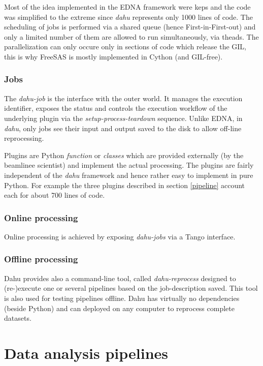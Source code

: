 \documentclass[preprint]{iucr}              %
\begin{document}
Most of the idea implemented in the EDNA framework were keps and the code was simplified to the extreme since \textit{dahu} represents only 1000 lines of code. 
The scheduling of jobs is performed via a shared queue (hence First-in-First-out) and only a limited number of them are allowed to run simultaneously, via theads.
The parallelization can only occure only in sections of code which release the GIL, this is why FreeSAS is mostly implemented in Cython (and GIL-free).      

\subsubsection{Jobs}

The \textit{dahu-job} is the interface with the outer world. 
It manages the execution identifier, exposes the status and controls the execution workflow of the underlying plugin via the \textit{setup-process-teardown} sequence.
Unlike EDNA, in \textit{dahu}, only jobs see their input and output saved to the disk to allow off-line reprocessing.   

Plugins are Python \textit{function} or \textit{classes} which are provided externally (by the beamlinee scientist) and implement the actual processing.
The plugins are fairly independent of the \textit{dahu} framework and hence rather easy to implement in pure Python.
For example the three plugins described in section \ref{pipeline} account each for about 700 lines of code.  

\subsubsection{Online processing}
Online processing is achieved by exposing \textit{dahu-jobs} via a Tango interface.

\subsubsection{Offline processing}
Dahu provides also a command-line tool, called \textit{dahu-reprocess} designed to (re-)execute one or several pipelines based on the job-description saved. 
This tool is also used for testing pipelines offline.
Dahu has virtually no dependencies (beside Python) and can deployed on any computer to reprocess complete datasets. 

\section{Data analysis pipelines}
\end{document}
